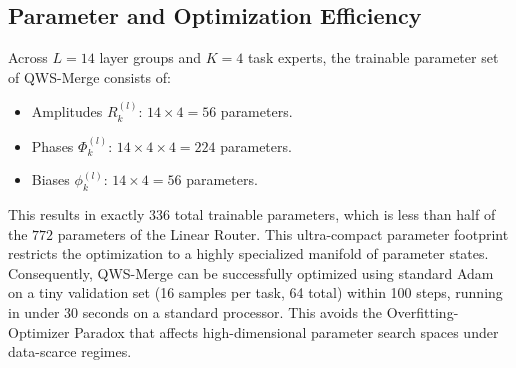 \subsection{Parameter and Optimization Efficiency}
Across $L=14$ layer groups and $K=4$ task experts, the trainable parameter set of QWS-Merge consists of:
\begin{itemize}
    \item Amplitudes $R_k^{(l)}$: $14 \times 4 = 56$ parameters.
    \item Phases $\Phi_k^{(l)}$: $14 \times 4 \times 4 = 224$ parameters.
    \item Biases $\phi_k^{(l)}$: $14 \times 4 = 56$ parameters.
\end{itemize}
This results in exactly $336$ total trainable parameters, which is less than half of the $772$ parameters of the Linear Router. This ultra-compact parameter footprint restricts the optimization to a highly specialized manifold of parameter states. Consequently, QWS-Merge can be successfully optimized using standard Adam on a tiny validation set (16 samples per task, 64 total) within 100 steps, running in under 30 seconds on a standard processor. This avoids the Overfitting-Optimizer Paradox that affects high-dimensional parameter search spaces under data-scarce regimes.
